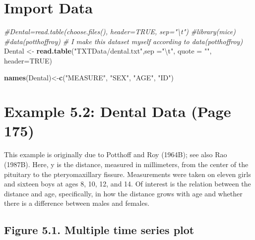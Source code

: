 \documentclass[]{book}
\newenvironment{Shaded}{\begin{snugshade}}{\end{snugshade}}
\newcommand{\CharTok}[1]{\textcolor[rgb]{0.31,0.60,0.02}{#1}}
\newcommand{\CommentTok}[1]{\textcolor[rgb]{0.56,0.35,0.01}{\textit{#1}}}
\newcommand{\DataTypeTok}[1]{\textcolor[rgb]{0.13,0.29,0.53}{#1}}
\newcommand{\KeywordTok}[1]{\textcolor[rgb]{0.13,0.29,0.53}{\textbf{#1}}}
\newcommand{\NormalTok}[1]{#1}
\newcommand{\OtherTok}[1]{\textcolor[rgb]{0.56,0.35,0.01}{#1}}
\newcommand{\StringTok}[1]{\textcolor[rgb]{0.31,0.60,0.02}{#1}}
\begin{document}
\hypertarget{import-data-4}{%
\section{Import Data}\label{import-data-4}}

\begin{Shaded}
\begin{Highlighting}[]
\CommentTok{#Dental=read.table(choose.files(), header=TRUE, sep="\textbackslash{}t")}
\CommentTok{#library(mice)}
\CommentTok{#data(potthoffroy)}
\CommentTok{# I make this dataset myself according to data(potthoffroy)}
\NormalTok{Dental <-}\StringTok{ }\KeywordTok{read.table}\NormalTok{(}\StringTok{"TXTData/dental.txt"}\NormalTok{,}\DataTypeTok{sep =}\StringTok{"}\CharTok{\textbackslash{}t}\StringTok{"}\NormalTok{, }\DataTypeTok{quote =} \StringTok{""}\NormalTok{, }\DataTypeTok{header=}\OtherTok{TRUE}\NormalTok{)}

\KeywordTok{names}\NormalTok{(Dental)<-}\KeywordTok{c}\NormalTok{(}\StringTok{"MEASURE"}\NormalTok{, }\StringTok{"SEX"}\NormalTok{, }\StringTok{"AGE"}\NormalTok{, }\StringTok{"ID"}\NormalTok{)}
\end{Highlighting}
\end{Shaded}

\hypertarget{example-5.2-dental-data-page-175}{%
\section{Example 5.2: Dental Data (Page 175)}\label{example-5.2-dental-data-page-175}}

This example is originally due to Potthoff and Roy (1964B); see also Rao (1987B). Here, y is the distance, measured in millimeters, from the center of the pituitary to the pteryomaxillary fissure. Measurements were taken on eleven girls and sixteen boys at ages 8, 10, 12, and 14. Of interest is the relation between the distance and age, specifically, in how the distance grows with age and whether there is a difference between males and females.

\hypertarget{figure-5.1.-multiple-time-series-plot}{%
\subsection{Figure 5.1. Multiple time series plot}\label{figure-5.1.-multiple-time-series-plot}}
\end{document}
